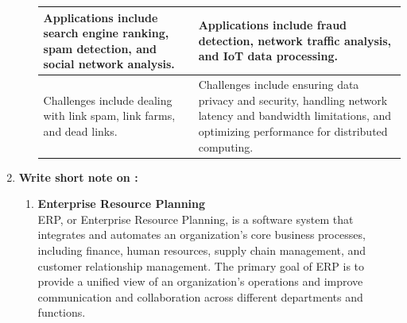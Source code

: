 \documentclass[12pt]{article}
\begin{document}
\begin{enumerate}
\begin{enumerate}
\begin{longtable}{|p{6cm}|p{6cm}|}
        \hline
        Applications include search engine ranking, spam detection, and social network analysis. & Applications include fraud detection, network traffic analysis, and IoT data processing. \\
        \hline
        Challenges include dealing with link spam, link farms, and dead links. & Challenges include ensuring data privacy and security, handling network latency and bandwidth limitations, and optimizing performance for distributed computing. \\
        \hline
        \end{longtable}
\end{enumerate}
\item {\bfseries Write short note on :}
\begin{enumerate}
    \item {\bfseries Enterprise Resource Planning\\}
    ERP, or Enterprise Resource Planning, is a software system that integrates and automates an organization's core business processes, including finance, human resources, supply chain management, and customer relationship management. The primary goal of ERP is to provide a unified view of an organization's operations and improve communication and collaboration across different departments and functions.


\end{enumerate}
\end{enumerate}
\end{document}
